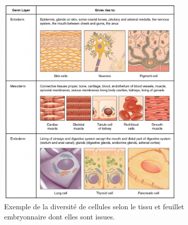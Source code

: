 \begin{figure}[hb!]
    \centering
    \includegraphics[width=0.8\textwidth]{img/intro/cell_type_feuillet.jpg}
    \caption{Exemple de la diversité de cellules selon le tissu et feuillet embryonnaire dont elles sont issues.}
    \label{fig:intro_tissu_type_cellulaire}
\end{figure}


